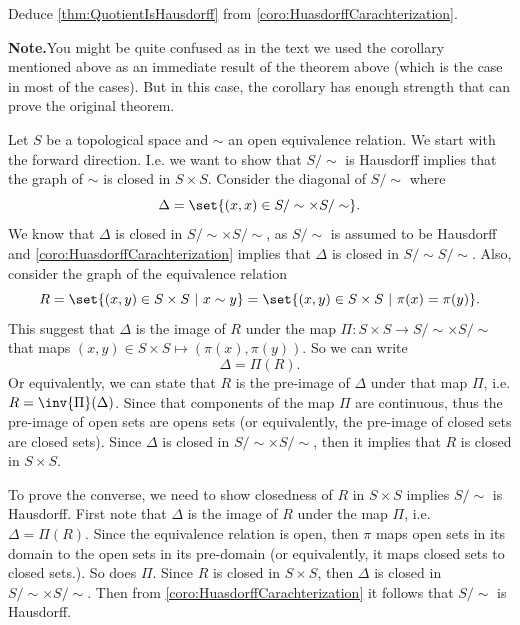 \begin{problem}
	\label{problem:CorollaryImpliedTheorem_HauadorffCharacter}
	Deduce \autoref{thm:QuotientIsHausdorff} from \autoref{coro:HuasdorffCarachterization}. 
	
	\textbf{Note.}You might be quite confused as in the text we used the corollary mentioned above as an immediate result of the theorem above (which is the case in most of the cases). But in this case, the corollary has enough strength that can prove the original theorem.
\end{problem}
\begin{solution}
	Let $ S $ be a topological space and $ \sim $ an open equivalence relation. We start with the forward direction. I.e. we want to show that $ S/\sim $ is Hausdorff implies that the graph of $ \sim $ is closed in $ S\times S $. Consider the diagonal of $ S/\sim $ where
	\[ \Delta = \set{(x,x) \in S/\sim \times S/\sim}. \]
	We know that $ \Delta $ is closed in $  S/\sim \times  S/\sim  $, as $ S/\sim $ is assumed to be Hausdorff and \autoref{coro:HuasdorffCarachterization} implies that $ \Delta $ is closed in $  S/\sim  S/\sim  $.
	Also, consider the graph of the equivalence relation 
	\[ R = \set{(x,y) \in S\times S\ |\ x\sim y} = \set{(x,y)\in S\times S\ |\ \pi(x) = \pi(y) }. \]
	This suggest that $ \Delta $ is the image of $ R $ under the map $ \Pi: S\times S \to S/\sim \times S/\sim $ that maps $ (x,y) \in S\times S \mapsto (\pi(x),\pi(y)) $. So we can write 
	\[ \Delta = \Pi(R). \]
	Or equivalently, we can state that $ R $ is the pre-image of $ \Delta $ under that map $ \Pi $, i.e. $ R = \inv{\Pi}(\Delta) $. Since that components of the map $ \Pi $ are continuous, thus the pre-image of open sets are opens sets (or equivalently, the pre-image of closed sets are closed sets). Since $ \Delta $ is closed in $  S/\sim \times  S/\sim  $, then it implies that $ R $ is closed in $ S \times S $.
	
	To prove the converse, we need to show closedness of $ R $ in $ S\times S $ implies $ S/\sim $ is Hausdorff. First note that $ \Delta $ is the image of $ R $ under the map $ \Pi $, i.e. $ \Delta = \Pi(R) $. Since the equivalence relation is open, then $ \pi $ maps open sets in its domain to the open sets in its pre-domain (or equivalently, it maps closed sets to closed sets.). So does $  \Pi $. Since $ R $ is closed in $ S\times S $, then $ \Delta $ is closed in $ S/\sim \times S/\sim $. Then from \autoref{coro:HuasdorffCarachterization} it follows that $ S/\sim $ is Hausdorff.
\end{solution}

